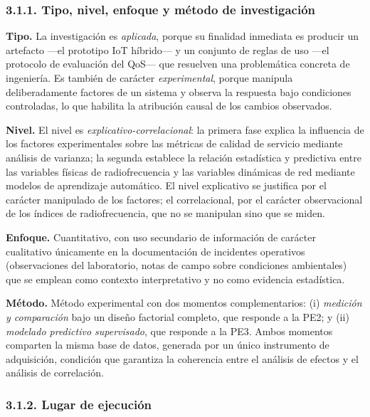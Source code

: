 \documentclass[
  12pt,
]{article}
\begin{document}
\subsubsection{3.1.1. Tipo, nivel, enfoque y método de
investigación}\label{tipo-nivel-enfoque-y-muxe9todo-de-investigaciuxf3n}

\textbf{Tipo.} La investigación es \emph{aplicada}, porque su finalidad
inmediata es producir un artefacto —el prototipo IoT híbrido— y un
conjunto de reglas de uso —el protocolo de evaluación del QoS— que
resuelven una problemática concreta de ingeniería. Es también de
carácter \emph{experimental}, porque manipula deliberadamente factores
de un sistema y observa la respuesta bajo condiciones controladas, lo
que habilita la atribución causal de los cambios observados.

\textbf{Nivel.} El nivel es \emph{explicativo-correlacional}: la primera
fase explica la influencia de los factores experimentales sobre las
métricas de calidad de servicio mediante análisis de varianza; la
segunda establece la relación estadística y predictiva entre las
variables físicas de radiofrecuencia y las variables dinámicas de red
mediante modelos de aprendizaje automático. El nivel explicativo se
justifica por el carácter manipulado de los factores; el correlacional,
por el carácter observacional de los índices de radiofrecuencia, que no
se manipulan sino que se miden.

\textbf{Enfoque.} Cuantitativo, con uso secundario de información de
carácter cualitativo únicamente en la documentación de incidentes
operativos (observaciones del laboratorio, notas de campo sobre
condiciones ambientales) que se emplean como contexto interpretativo y
no como evidencia estadística.

\textbf{Método.} Método experimental con dos momentos complementarios:
(i) \emph{medición y comparación} bajo un diseño factorial completo, que
responde a la PE2; y (ii) \emph{modelado predictivo supervisado}, que
responde a la PE3. Ambos momentos comparten la misma base de datos,
generada por un único instrumento de adquisición, condición que
garantiza la coherencia entre el análisis de efectos y el análisis de
correlación.

\subsubsection{3.1.2. Lugar de ejecución}\label{lugar-de-ejecuciuxf3n}
\end{document}
